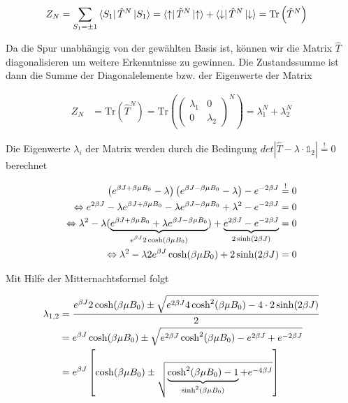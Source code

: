 \begin{align}
  \label{eq:27}
  Z_N &=\sum_{S_1=\pm 1} \left\langle S_1 \right| \hat T^N \left| S_1 \right\rangle =  \left\langle \uparrow \right| \hat T^N \left| \uparrow \right\rangle +  \left\langle \downarrow \right| \hat T^N \left| \downarrow \right\rangle = \text{Tr}\left( \hat T^N \right)
\end{align}

Da die Spur unabhängig von der gewählten Basis ist, können wir die Matrix \(\hat T\) diagonalisieren um weitere Erkenntnisse zu gewinnen. Die Zustandssumme ist dann die Summe der Diagonalelemente bzw. der Eigenwerte der Matrix

\begin{align}
  \label{eq:28}
  Z_N &= \text{Tr}\left( \hat T^N \right) = 
\text{Tr}\left(
  \begin{pmatrix}
    \lambda_1&0\\
0&\lambda_2
  \end{pmatrix}^N
\right)=
\lambda_1^N +  \lambda_2^N
\end{align}

Die Eigenwerte \(\lambda_i\) der Matrix werden durch die Bedingung \(det|\hat T - \lambda\cdot\mathds 1_2|\stackrel{!}=0\) berechnet

\begin{align}
  \label{eq:29}
\left(  e^{\beta J  + \beta \mu B_0 } -\lambda  \right) \left( e^{\beta J  - \beta \mu B_0 } -\lambda  \right) - e^{-2\beta J}\stackrel{!}=0 \notag\\
\Leftrightarrow e^{2\beta J} - \lambda e^{\beta J  + \beta \mu B_0 } - \lambda e^{\beta J  - \beta \mu B_0 } + \lambda^2 - e^{-2\beta J} =0 \notag\\
\Leftrightarrow \lambda^2 - \lambda (\underbr{e^{\beta J  + \beta \mu B_0 } + \lambda e^{\beta J  - \beta \mu B_0 }}_{e^{\beta J}2\cosh(\beta \mu B_0 ) }) + \underbr{ e^{2\beta J} - e^{-2\beta J}}_{2\sinh(2\beta J)} =0 \notag\\
\Leftrightarrow \lambda^2 - \lambda 2 e^{\beta J}\cosh(\beta \mu B_0 )  + 2\sinh(2\beta J) =0 \notag\\
\end{align}

Mit Hilfe der Mitternachtsformel folgt

\begin{align}
  \label{eq:30}
  \lambda_{1,2} &= \frac{ e^{\beta J}2\cosh(\beta \mu B_0)\pm \sqrt{e^{2\beta J}4\cosh^2(\beta \mu B_0) - 4\cdot 2\sinh(2\beta J)  } }{2} \notag\\
&=  e^{\beta J}\cosh(\beta \mu B_0)\pm \sqrt{e^{2\beta J}\cosh^2(\beta \mu B_0) - e^{2\beta J} + e^{-2\beta J}   }  \notag\\
&=  e^{\beta J}\left[\cosh(\beta \mu B_0)\pm \sqrt{\underbr{\cosh^2(\beta \mu B_0) - 1}_{\sinh^2(\beta \mu B_0)} + e^{-4\beta J}   } \right] 
\end{align}


